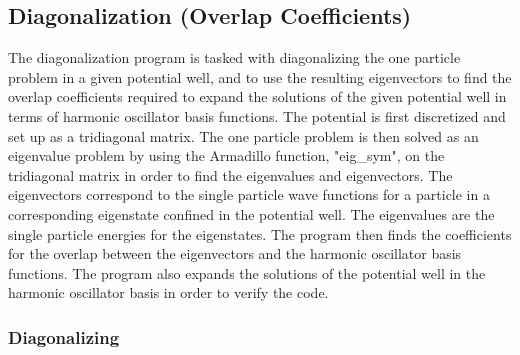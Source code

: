 \documentclass[../main.tex]{subfiles}
\begin{document}
\subsection{Diagonalization (Overlap Coefficients)}

The diagonalization program is tasked with diagonalizing the one particle problem in a given potential well, and to use the resulting eigenvectors to find the overlap coefficients required to expand the solutions of the given potential well in terms of harmonic oscillator basis functions. The potential is first discretized and set up as a tridiagonal matrix. The one particle problem is then solved as an eigenvalue problem by using the Armadillo function, "eig\_sym", on the tridiagonal matrix in order to find the eigenvalues and eigenvectors. The eigenvectors correspond to the single particle wave functions for a particle in a corresponding eigenstate confined in the potential well. The eigenvalues are the single particle energies for the eigenstates. The program then finds the coefficients for the overlap between the eigenvectors and the harmonic oscillator basis functions. The program also expands the solutions of the potential well in the harmonic oscillator basis in order to verify the code.

\subsubsection{Diagonalizing}
\end{document}
